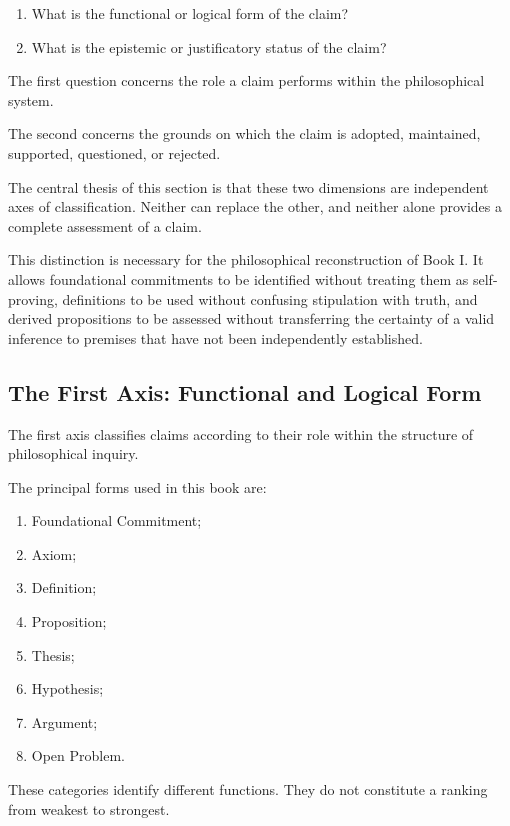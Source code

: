 \begin{enumerate}
    \item What is the functional or logical form
    of the claim?
    \item What is the epistemic or justificatory
    status of the claim?
\end{enumerate}

The first question concerns the role a claim
performs within the philosophical system.

The second concerns the grounds on which the
claim is adopted, maintained, supported,
questioned, or rejected.

The central thesis of this section is that
these two dimensions are independent axes
of classification. Neither can replace
the other, and neither alone provides
a complete assessment of a claim.

This distinction is necessary for the
philosophical reconstruction of Book I.
It allows foundational commitments to be
identified without treating them as
self-proving, definitions to be used
without confusing stipulation with truth,
and derived propositions to be assessed
without transferring the certainty of
a valid inference to premises that have
not been independently established.

\subsection{The First Axis: Functional and Logical Form}

The first axis classifies claims according
to their role within the structure of
philosophical inquiry.

The principal forms used in this book are:

\begin{enumerate}
    \item Foundational Commitment;
    \item Axiom;
    \item Definition;
    \item Proposition;
    \item Thesis;
    \item Hypothesis;
    \item Argument;
    \item Open Problem.
\end{enumerate}

These categories identify different
functions. They do not constitute
a ranking from weakest to strongest.

